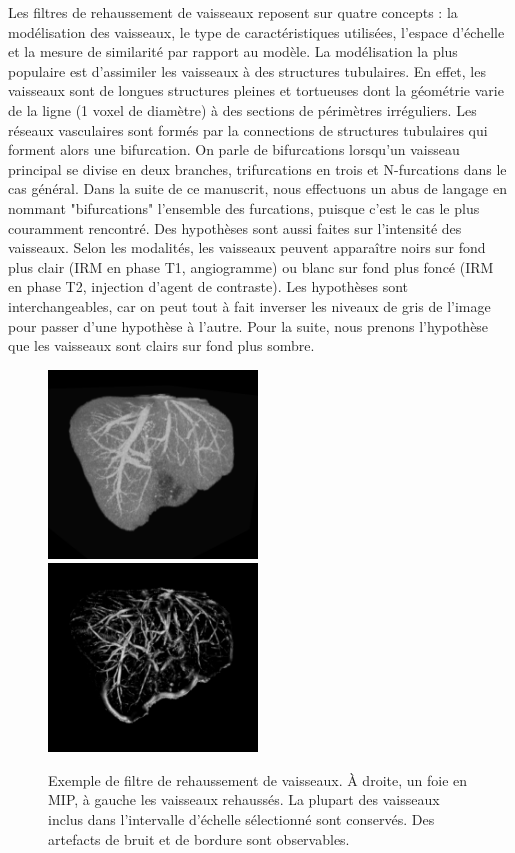 Les filtres de rehaussement de vaisseaux reposent sur quatre concepts : la modélisation des vaisseaux, le type de caractéristiques utilisées, l'espace d'échelle et la mesure de similarité par rapport au modèle. La modélisation la plus populaire est d'assimiler les vaisseaux à des structures tubulaires. En effet, les vaisseaux sont de longues structures pleines et tortueuses dont la géométrie varie de la ligne (1 voxel de diamètre) à des sections de périmètres irréguliers. Les réseaux vasculaires sont formés par la connections de structures tubulaires qui forment alors une bifurcation. On parle de  bifurcations lorsqu'un vaisseau principal se divise en deux branches, trifurcations en trois et N-furcations dans le cas général. Dans la suite de ce manuscrit, nous effectuons un abus de langage en nommant "bifurcations" l'ensemble des furcations, puisque c'est le cas le plus couramment rencontré. Des hypothèses sont aussi faites sur l'intensité des vaisseaux. Selon les modalités, les vaisseaux peuvent apparaître noirs sur fond plus clair (IRM en phase T1, angiogramme) ou blanc sur fond plus foncé (IRM en phase T2, injection d'agent de contraste). Les hypothèses sont interchangeables, car on peut tout à fait inverser les niveaux de gris de l'image pour passer d'une hypothèse à l'autre. Pour la suite, nous prenons l'hypothèse que les vaisseaux sont clairs sur fond plus sombre.

\begin{figure}[h]
  \centering
  \includegraphics[height=5cm]{Images/enhancement_part1.png}
  \includegraphics[height=5cm]{Images/enhancement_part2.png}
  \caption{Exemple de filtre de rehaussement de vaisseaux. À droite, un foie en MIP, à gauche les vaisseaux rehaussés. La plupart des vaisseaux inclus dans l'intervalle d'échelle sélectionné sont conservés. Des artefacts de bruit et de bordure sont observables.}
  \label{fig:exemple_vesselness}
\end{figure}

